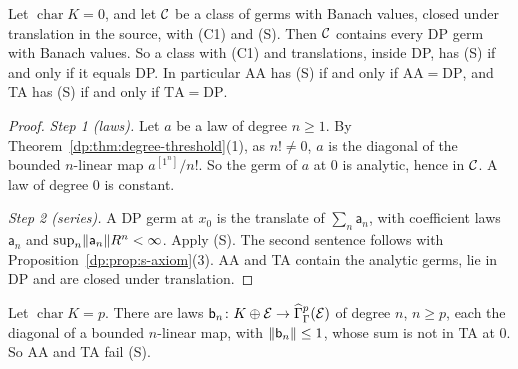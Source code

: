 \begin{proposition}[in characteristic $0$]\label{dp:prop:s-char0}
Let $\operatorname{char}K=0$, and let $\mathcal{C}$ be a class of germs with Banach values, closed under translation in the source, with \textup{(C1)} and \textup{(S)}. Then $\mathcal{C}$ contains every DP germ with Banach values. So a class with \textup{(C1)} and translations, inside DP, has \textup{(S)} if and only if it equals DP. In particular AA has \textup{(S)} if and only if $\mathrm{AA}=\mathrm{DP}$, and TA has \textup{(S)} if and only if $\mathrm{TA}=\mathrm{DP}$.
\end{proposition}

\begin{proof}
\emph{Step 1 (laws).} Let $a$ be a law of degree $n\ge1$. By Theorem~\ref{dp:thm:degree-threshold}(1), as $n!\ne0$, $a$ is the diagonal of the bounded $n$\nobreakdash-linear map $a^{[1^n]}/n!$. So the germ of $a$ at $0$ is analytic, hence in $\mathcal{C}$. A law of degree $0$ is constant.

\emph{Step 2 (series).} A DP germ at $x_0$ is the translate of $\sum_n\mathsf a_n$, with coefficient laws $\mathsf a_n$ and $\sup_n\lVert \mathsf a_n\rVert R^n<\infty$. Apply (S). The second sentence follows with Proposition~\ref{dp:prop:s-axiom}(3). AA and TA contain the analytic germs, lie in DP and are closed under translation.
\end{proof}

\begin{proposition}[in characteristic $p$]\label{dp:prop:s-fails}
Let $\operatorname{char}K=p$. There are laws $\mathsf b_n\colon K\oplus\mathcal E\to\widehat\Gamma^p_\Gamma(\mathcal E)$ of degree $n$, $n\ge p$, each the diagonal of a bounded $n$\nobreakdash-linear map, with $\lVert \mathsf b_n\rVert\le1$, whose sum is not in TA at $0$. So AA and TA fail \textup{(S)}.
\end{proposition}

